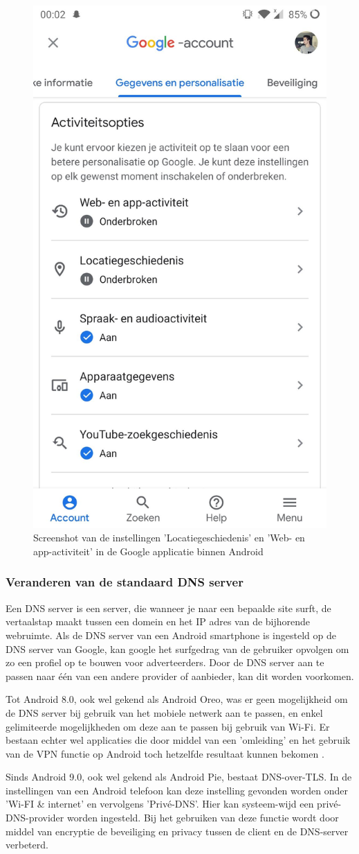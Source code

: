 \begin{figure}
    \centering
    \includegraphics[width=0.4\linewidth]{img/activiteitsopties-mobiel.jpg}
    \caption{Screenshot van de instellingen 'Locatiegeschiedenis' en 'Web- en app-activiteit' in de Google applicatie binnen Android}
    \label{fig:activityoptions_mobile}
\end{figure}


\subsubsection{Veranderen van de standaard DNS server}
Een DNS server is een server, die wanneer je naar een bepaalde site surft, de vertaalstap maakt tussen een domein en het IP adres van de bijhorende webruimte. Als de DNS server van een Android smartphone is ingesteld op de DNS server van Google, kan google het surfgedrag van de gebruiker opvolgen om zo een profiel op te bouwen voor adverteerders. Door de DNS server aan te passen naar één van een andere provider of aanbieder, kan dit worden voorkomen.

Tot Android 8.0, ook wel gekend als Android Oreo, was er geen mogelijkheid om de DNS server bij gebruik van het mobiele netwerk aan te passen, en enkel gelimiteerde mogelijkheden om deze aan te passen bij gebruik van Wi-Fi. Er bestaan echter wel applicaties die door middel van een 'omleiding' en het gebruik van de VPN functie op Android toch hetzelfde resultaat kunnen bekomen \autocite{knight_degoogle}. 

Sinds Android 9.0, ook wel gekend als Android Pie, bestaat DNS-over-TLS. In de instellingen van een Android telefoon kan deze instelling gevonden worden onder 'Wi-FI \& internet' en vervolgens 'Privé-DNS'. Hier kan systeem-wijd een privé-DNS-provider worden ingesteld. Bij het gebruiken van deze functie wordt door middel van encryptie de beveiliging en privacy tussen de client en de DNS-server verbeterd. \autocite{google_dns-tls}

